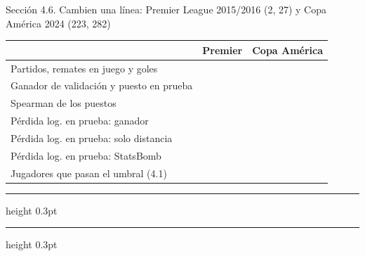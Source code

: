 \documentclass[10pt,letterpaper]{article}
\newcommand{\renglon}{\vspace{6mm}\hrule height 0.3pt\relax}
\begin{document}
\begin{caja}{Sección 4.6. Cambien una línea: Premier League 2015/2016 (2, 27) y Copa América 2024 (223, 282)}
\begin{tabularx}{\linewidth}{|p{7.2cm}|X|X|}\hline
\textbf{\small } & \textbf{\small Premier} & \textbf{\small Copa América}\\\hline
\rule{0pt}{7mm}Partidos, remates en juego y goles &  & \\\hline
\rule{0pt}{7mm}Ganador de validación y puesto en prueba &  & \\\hline
\rule{0pt}{7mm}Spearman de los puestos &  & \\\hline
\rule{0pt}{7mm}Pérdida log. en prueba: ganador &  & \\\hline
\rule{0pt}{7mm}Pérdida log. en prueba: solo distancia &  & \\\hline
\rule{0pt}{7mm}Pérdida log. en prueba: StatsBomb &  & \\\hline
\rule{0pt}{7mm}Jugadores que pasan el umbral (4.1) &  & \\\hline
\end{tabularx}
\par\vspace{3mm}{\small\bfseries ¿Qué conclusiones de la liga sobreviven en un torneo de 32 partidos y cuáles no?}\renglon\renglon
\end{caja}
\end{document}
